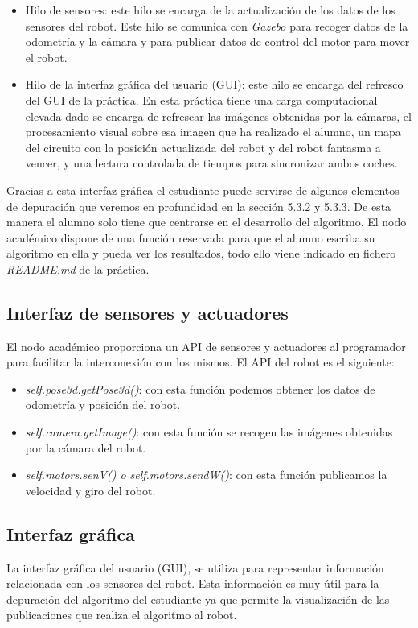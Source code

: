 \begin{itemize}
	\item Hilo de sensores: este hilo se encarga de la actualización de los datos de los sensores del robot. Este hilo se comunica con \textit{Gazebo} para recoger datos de la odometría y la cámara y para publicar datos de control del motor para mover el robot.
	\item Hilo de la interfaz gráfica del usuario (GUI): este hilo se encarga del refresco del GUI de la práctica. En esta práctica tiene una carga computacional elevada dado se encarga de refrescar las imágenes obtenidas por la cámaras, el procesamiento visual sobre esa imagen que ha realizado el alumno, un mapa del circuito con la posición actualizada del robot y del robot fantasma a vencer, y una lectura controlada de tiempos para sincronizar ambos coches.
\end{itemize}

Gracias a esta interfaz gráfica el estudiante puede servirse de algunos elementos de depuración que veremos en profundidad en la sección 5.3.2 y 5.3.3. De esta manera el alumno solo tiene que centrarse en el desarrollo del algoritmo. El nodo académico dispone de una función reservada para que el alumno escriba su algoritmo en ella y pueda ver los resultados, todo ello viene indicado en fichero \textit{README.md} de la práctica.

\subsection{Interfaz de sensores y actuadores}
El nodo académico proporciona un API de sensores y actuadores al programador para facilitar la interconexión con los mismos. El API del robot es el siguiente:

\begin{itemize}
	\item \textit{self.pose3d.getPose3d()}: con esta función podemos obtener los datos de odometría y posición del robot.
	\item \textit{self.camera.getImage()}: con esta función se recogen las imágenes obtenidas por la cámara del robot.
	\item \textit{self.motors.senV() o self.motors.sendW()}: con esta función publicamos la velocidad y giro del robot.
\end{itemize}

\subsection{Interfaz gráfica}
La interfaz gráfica del usuario (GUI), se utiliza para representar información relacionada con los sensores del robot. Esta información es muy útil para la depuración del algoritmo del estudiante ya que permite la visualización de las publicaciones que realiza el algoritmo al robot.

